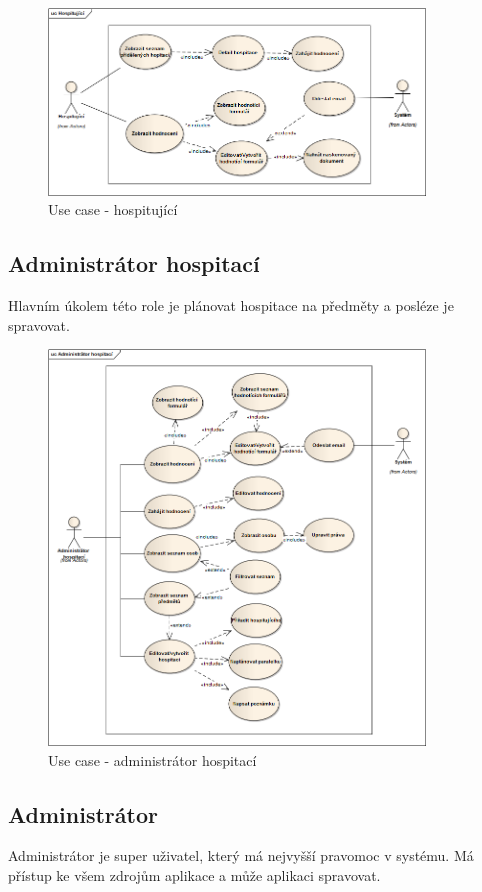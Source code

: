 \begin{figure}[H]
\begin{center}
\includegraphics[width=10cm]{figures/actor_observer}
\caption{Use case - hospitující}
\label{fig:actor_observer}
\end{center}
\end{figure}

\subsection{Administrátor hospitací}
Hlavním úkolem této role je plánovat hospitace na předměty a posléze je spravovat.

\begin{figure}[H]
\begin{center}
\includegraphics[width=10cm]{figures/actor_admin}
\caption{Use case - administrátor hospitací}
\label{fig:actor_admin}
\end{center}
\end{figure}

\subsection{Administrátor}
Administrátor je super uživatel, který má nejvyšší pravomoc v systému. Má přístup ke všem zdrojům aplikace a může aplikaci spravovat.

